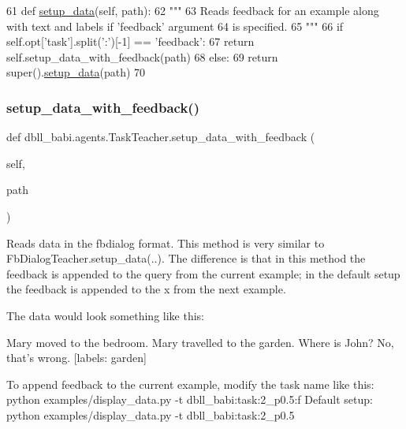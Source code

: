 \begin{DoxyCode}
61     \textcolor{keyword}{def }\hyperlink{namespaceparlai_1_1tasks_1_1multinli_1_1agents_a4fa2cb0ba1ed745336ad8bceed36b841}{setup\_data}(self, path):
62         \textcolor{stringliteral}{"""}
63 \textcolor{stringliteral}{        Reads feedback for an example along with text and labels if 'feedback' argument}
64 \textcolor{stringliteral}{        is specified.}
65 \textcolor{stringliteral}{        """}
66         \textcolor{keywordflow}{if} self.opt[\textcolor{stringliteral}{'task'}].split(\textcolor{stringliteral}{':'})[-1] == \textcolor{stringliteral}{'feedback'}:
67             \textcolor{keywordflow}{return} self.setup\_data\_with\_feedback(path)
68         \textcolor{keywordflow}{else}:
69             \textcolor{keywordflow}{return} super().\hyperlink{namespaceparlai_1_1tasks_1_1multinli_1_1agents_a4fa2cb0ba1ed745336ad8bceed36b841}{setup\_data}(path)
70 
\end{DoxyCode}
\mbox{\label{classdbll__babi_1_1agents_1_1TaskTeacher_a3275c0a4a11a3f5e723259d487db03f8}} 
\subsubsection{\texorpdfstring{setup\+\_\+data\+\_\+with\+\_\+feedback()}{setup\_data\_with\_feedback()}}
{\footnotesize\ttfamily def dbll\+\_\+babi.\+agents.\+Task\+Teacher.\+setup\+\_\+data\+\_\+with\+\_\+feedback (\begin{DoxyParamCaption}\item[{}]{self,  }\item[{}]{path }\end{DoxyParamCaption})}

\begin{DoxyVerb}Reads data in the fbdialog format. This method is very similar to
FbDialogTeacher.setup_data(..). The difference is that in this method the
feedback is appended to the query from the current example; in the default setup
the feedback is appended to the x from the next example.

The data would look something like this:

Mary moved to the bedroom.
Mary travelled to the garden.
Where is John?
No, that's wrong.
[labels: garden]

To append feedback to the current example, modify the task name like this:
  python examples/display_data.py -t dbll_babi:task:2_p0.5:f
Default setup:
  python examples/display_data.py -t dbll_babi:task:2_p0.5
\end{DoxyVerb}
 

